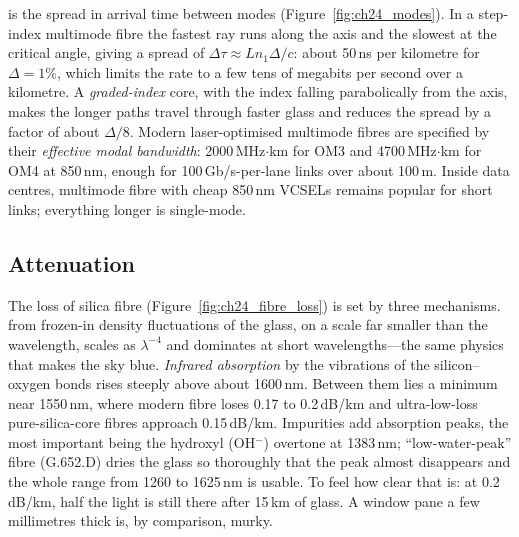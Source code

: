 
 is the spread in arrival time between modes (Figure~\ref{fig:ch24_modes}). In
a step-index multimode fibre the fastest ray runs along the axis and the slowest at the critical
angle, giving a spread of $\Delta\tau\approx Ln_1\Delta/c$: about 50\,ns per kilometre for
$\Delta=1\%$, which limits the rate to a few tens of megabits per second over a kilometre. A
\emph{graded-index} core, with the index falling parabolically from the axis, makes the longer paths
travel through faster glass and reduces the spread by a factor of about $\Delta/8$. Modern
laser-optimised multimode fibres are specified by their \emph{effective modal bandwidth}:
2000\,MHz$\cdot$km for OM3 and 4700\,MHz$\cdot$km for OM4 at 850\,nm, enough for 100\,Gb/s-per-lane
links over about 100\,m. Inside data centres, multimode fibre with cheap 850\,nm VCSELs remains
popular for short links; everything longer is single-mode.


\subsection{Attenuation}

The loss of silica fibre (Figure~\ref{fig:ch24_fibre_loss}) is set by three mechanisms.
 from frozen-in density fluctuations of the glass, on a scale far smaller than
the wavelength, scales as $\lambda^{-4}$ and dominates at short wavelengths---the same physics that makes
the sky blue. \emph{Infrared absorption} by the vibrations of the silicon--oxygen bonds rises steeply
above about 1600\,nm. Between them lies a minimum near 1550\,nm, where modern fibre loses 0.17 to
0.2\,dB/km and ultra-low-loss pure-silica-core fibres approach 0.15\,dB/km. Impurities add absorption
peaks, the most important being the hydroxyl (OH$^-$) overtone at 1383\,nm; ``low-water-peak'' fibre
(G.652.D) dries the glass so thoroughly that the peak almost disappears and the whole range from 1260
to 1625\,nm is usable. To feel how clear that is: at 0.2\,dB/km, half the light is still there after
15\,km of glass. A window pane a few millimetres thick is, by comparison, murky.


